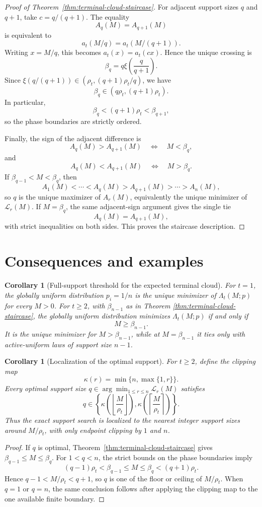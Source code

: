 \documentclass[11pt]{article}
\newtheorem{corollary}[theorem]{Corollary}
\theoremstyle{definition}
\theoremstyle{remark}
\newcommand{\1}{\mathbf 1}
\begin{document}
\begin{proof}[Proof of Theorem~\ref{thm:terminal-cloud-staircase}]
For adjacent support sizes \(q\) and \(q+1\), take \(c=q/(q+1)\).  The equality
\[
  A_q(M)=A_{q+1}(M)
\]
is equivalent to
\[
  a_t(M/q)=a_t(M/(q+1)).
\]
Writing \(x=M/q\), this becomes \(a_t(x)=a_t(cx)\).  Hence the unique crossing is
\[
  \beta_q=q\xi\!\left(\frac{q}{q+1}\right).
\]
Since \(\xi(q/(q+1))\in(\rho_t,(q+1)\rho_t/q)\), we have
\[
  \beta_q\in(q\rho_t,(q+1)\rho_t).
\]
In particular,
\[
  \beta_q<(q+1)\rho_t<\beta_{q+1},
\]
so the phase boundaries are strictly ordered.

Finally, the sign of the adjacent difference is
\[
  A_q(M)>A_{q+1}(M)
  \quad\Longleftrightarrow\quad
  M<\beta_q,
\]
and
\[
  A_q(M)<A_{q+1}(M)
  \quad\Longleftrightarrow\quad
  M>\beta_q.
\]
If \(\beta_{q-1}<M<\beta_q\), then
\[
  A_1(M)<\cdots<A_q(M)>A_{q+1}(M)>\cdots>A_n(M),
\]
so \(q\) is the unique maximizer of \(A_r(M)\), equivalently the unique minimizer of \(\mathcal L_r(M)\).  If \(M=\beta_q\), the same adjacent-sign argument gives the single tie
\[
  A_q(M)=A_{q+1}(M),
\]
with strict inequalities on both sides.  This proves the staircase description.
\end{proof}
\section{Consequences and examples}\label{sec:cloud-examples}
\begin{corollary}[Full-support threshold for the expected terminal cloud]\label{cor:cloud-full-support}
For \(t=1\), the globally uniform distribution \(p_i=1/n\) is the unique minimizer of \(\Lambda_t(M;p)\) for every \(M>0\).  For \(t\ge2\), with \(\beta_{n-1}\) as in Theorem \ref{thm:terminal-cloud-staircase}, the globally uniform distribution minimizes \(\Lambda_t(M;p)\) if and only if
\[
  M\ge \beta_{n-1}.
\]
It is the unique minimizer for \(M>\beta_{n-1}\), while at \(M=\beta_{n-1}\) it ties only with active-uniform laws of support size \(n-1\).
\end{corollary}

\begin{corollary}[Localization of the optimal support]\label{cor:cloud-localization}
For \(t\ge2\), define the clipping map
\[
  \kappa(r)=\min\{n,\max\{1,r\}\}.
\]
Every optimal support size \(q\in\arg\min_{1\le r\le n}\mathcal L_r(M)\) satisfies
\[
  q\in
  \left\{
  \kappa\!\left(\left\lfloor\frac{M}{\rho_t}\right\rfloor\right),
  \kappa\!\left(\left\lceil\frac{M}{\rho_t}\right\rceil\right)
  \right\}.
\]
Thus the exact support search is localized to the nearest integer support sizes around \(M/\rho_t\), with only endpoint clipping by \(1\) and \(n\).
\end{corollary}
\begin{proof}
If \(q\) is optimal, Theorem~\ref{thm:terminal-cloud-staircase} gives
\(\beta_{q-1}\le M\le\beta_q\).  For \(1<q<n\), the strict bounds
on the phase boundaries imply
\[
 (q-1)\rho_t<\beta_{q-1}\le M\le\beta_q<(q+1)\rho_t.
\]
Hence \(q-1<M/\rho_t<q+1\), so \(q\) is one of the floor or ceiling
of \(M/\rho_t\).  When \(q=1\) or \(q=n\), the same conclusion follows
after applying the clipping map to the one available finite boundary.
\end{proof}
\end{document}

